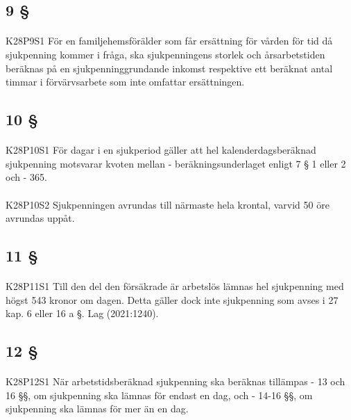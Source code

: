 \documentclass[a4paper,notitlepage,openany,10pt]{book}
\begin{document}
\subsection*{9 §}
\paragraph*{}
{\tiny K28P9S1}
För en familjehemsförälder som får ersättning för vården för tid då sjukpenning kommer i fråga, ska sjukpenningens storlek och årsarbetstiden beräknas på en sjukpenninggrundande inkomst respektive ett beräknat antal timmar i förvärvsarbete som inte omfattar ersättningen.
\subsection*{10 §}
\paragraph*{}
{\tiny K28P10S1}
För dagar i en sjukperiod gäller att hel kalenderdagsberäknad sjukpenning motsvarar kvoten mellan
\newline - beräkningsunderlaget enligt 7 § 1 eller 2 och
\newline - 365.
\paragraph*{}
{\tiny K28P10S2}
Sjukpenningen avrundas till närmaste hela krontal, varvid 50 öre avrundas uppåt.
\subsection*{11 §}
\paragraph*{}
{\tiny K28P11S1}
Till den del den försäkrade är arbetslös lämnas hel sjukpenning med högst 543 kronor om dagen. Detta gäller dock inte sjukpenning som avses i 27 kap. 6 eller 16 a §.
Lag (2021:1240).
\subsection*{12 §}
\paragraph*{}
{\tiny K28P12S1}
När arbetstidsberäknad sjukpenning ska beräknas tillämpas
\newline - 13 och 16 §§, om sjukpenning ska lämnas för endast en dag, och
\newline - 14-16 §§, om sjukpenning ska lämnas för mer än en dag.
\end{document}

